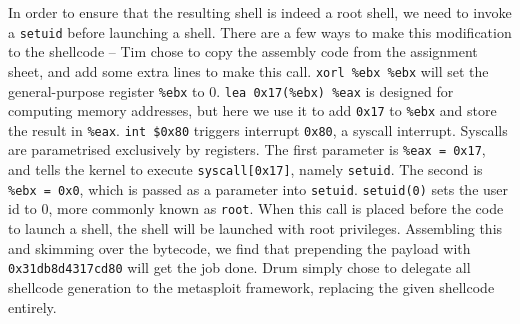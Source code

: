 In order to ensure that the resulting shell is indeed a root shell, we need to invoke a {\tt setuid} before launching a
shell. There are a few ways to make this modification to the shellcode -- Tim chose to copy the assembly code from the
assignment sheet, and add some extra lines to make this call. {\tt xorl \%ebx \%ebx} will set the general-purpose
register {\tt \%ebx} to 0. {\tt lea 0x17(\%ebx) \%eax} is designed for computing memory addresses, but here we use it to
add {\tt 0x17} to {\tt \%ebx} and store the result in {\tt \%eax}. {\tt int \$0x80} triggers interrupt {\tt 0x80}, a
syscall interrupt. Syscalls are parametrised exclusively by registers\cite{syscalls}.
The first parameter is {\tt \%eax = 0x17}, and tells the kernel to
execute {\tt syscall[0x17]}, namely {\tt setuid}. The second is {\tt \%ebx = 0x0}, which is passed as a parameter into
{\tt setuid}. {\tt setuid(0)} sets the user id to 0, more commonly known as {\tt root}. When this call is placed before
the code to launch a shell, the shell will be launched with root privileges. Assembling this and skimming over the
bytecode, we find that prepending the payload with {\tt 0x31db8d4317cd80} will get the job done. Drum simply chose to
delegate all shellcode generation to the metasploit framework, replacing the given shellcode entirely.
